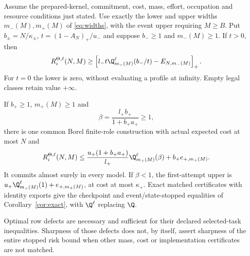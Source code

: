 \begin{theorem}\label{thm:width-transfer}
Assume the prepared-kernel, commitment, cost, mass, effort, occupation and resource conditions just stated. Use exactly the lower and upper widths $m_-(M),m_+(M)$ of \eqref{eq:widths}, with the event upper requiring $M\ge B$. Put $b_\pm=N/\kappa_\pm$, $t=(1-A_N)_+/u_-$ and suppose $b_-\ge1$ and $m_-(M)\ge1$. If $t>0$, then
\begin{equation}\label{eq:width-transfer-lower}
 R_i^{\Theta,\ell}(N,M)\ge
 \left[l_-t\Q_{m_-(M)}^\ell(b_-/t)-E_{N,m_-(M)}\right]_+.
\end{equation}
For $t=0$ the lower is zero, without evaluating a profile at infinity. Empty legal classes retain value $+\infty$.

If $b_+\ge1$, $m_+(M)\ge1$ and
\[
 \beta=\frac{l_+b_+}{1+b_+a_+}\ge1,
\]
there is one common Borel finite-role construction with actual expected cost at most $N$ and
\begin{equation}\label{eq:width-transfer-upper}
 R_i^{\Theta,\ell}(N,M)\le
 \frac{u_+(1+b_+a_+)}{l_+}\Q_{m_+(M)}^\ell(\beta)
             +b_+e_{+,m_+(M)}.
\end{equation}
It commits almost surely in every model. If $\beta<1$, the first-attempt upper is $u_+\Q_{m_+(M)}^\ell(1)+e_{+,m_+(M)}$, at cost at most $\kappa_+$. Exact matched certificates with identity exports give the checkpoint and event/state-stopped equalities of Corollary~\ref{cor:exact}, with $\Q^\ell$ replacing $\Q$.

Optimal row defects are necessary and sufficient for their declared selected-task inequalities. Sharpness of those defects does not, by itself, assert sharpness of the entire stopped risk bound when other mass, cost or implementation certificates are not matched.
\end{theorem}
